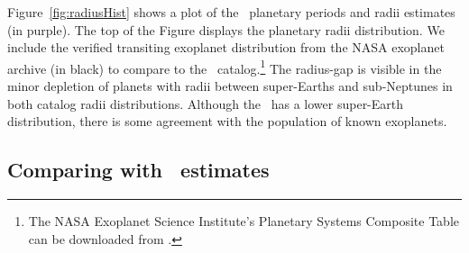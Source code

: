 \documentclass[floatfix,ApJL,twocolumn]{aastex631}
\begin{document}
Figure~\ref{fig:radiusHist} shows a plot of the \tessAtlas\ planetary periods and radii estimates (in purple). 
The top of the Figure displays the planetary radii distribution. 
We include the verified transiting exoplanet distribution from the NASA exoplanet archive (in black) to compare to the \tessAtlas\ catalog.\footnote{The NASA Exoplanet Science Institute's Planetary Systems Composite Table can be downloaded from \confirmedPlanetsDb.}
The \citet{Fulton:2017:AJ} radius-gap is visible in the minor depletion of planets with radii between super-Earths and sub-Neptunes in both catalog radii distributions.
Although the \tessAtlas\ has a lower super-Earth distribution, there is some agreement with the population of known exoplanets.


\subsection{Comparing with \exofop\ estimates}
\end{document}
